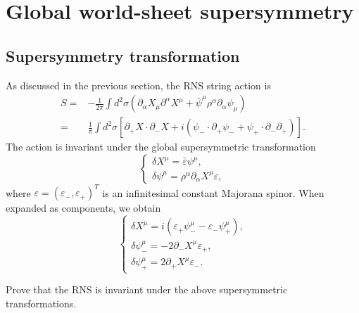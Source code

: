 \documentclass[graybox,envcountchap,sectrefs]{svmono}
\begin{document}
\section{Global world-sheet supersymmetry}
\subsection{Supersymmetry transformation}
As discussed in the previous section, the RNS string action is 
\begin{align}
S=&-\frac{1}{2 \pi} \int d^{2} \sigma\left(\partial_{\alpha} X_{\mu} \partial^{\alpha} X^{\mu}+\bar{\psi}^{\mu} \rho^{\alpha} \partial_{\alpha} \psi_{\mu}\right)\nonumber\\
=&\frac{1}{\pi}\int d^2\sigma\left[ \partial_+ X\cdot \partial_{-}X+i\left(
	\psi_{-}\cdot \partial_{+}\psi_{-}+\psi_{+} \cdot \partial_{-}\partial_{+}
	\right)\right].
\end{align}
The action is invariant under the global supersymmetric transformation
\begin{equation}
\begin{cases}
	\delta X^{\mu}=\bar{\varepsilon}\psi^{\mu},\\
	\delta \psi^{\mu}=\rho^{\alpha}\partial_{\alpha}X^{\mu}\varepsilon,
\end{cases}	
\end{equation}
where $\varepsilon=(\varepsilon_{-},\varepsilon_{+})^T$ is an infinitesimal constant Majorana spinor. When expanded as components, we obtain
\begin{equation}
\begin{cases}
\delta X^{\mu}=i\left(\varepsilon_{+} \psi_{-}^{\mu}-\varepsilon_{-} \psi_{+}^{\mu}\right), \\
\delta \psi_{-}^{\mu}=-2 \partial_{-} X^{\mu} \varepsilon_{+}, \\
\delta \psi_{+}^{\mu}=2 \partial_{+} X^{\mu} \varepsilon_{-}	.
\end{cases}
\end{equation}	

\begin{exercise}
Prove that the RNS is invariant under the above supersymmetric transformations.	
\end{exercise}
\end{document}
